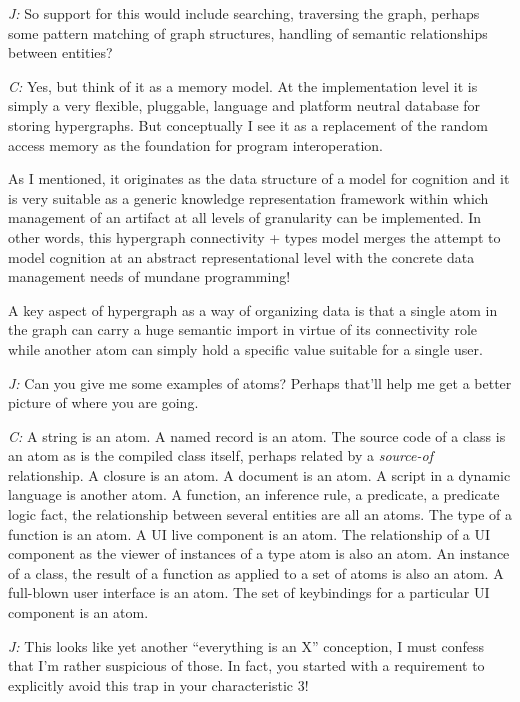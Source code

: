 \documentclass[10pt]{sigplanconf}
\begin{document}
\emph{J:} So support for this would include searching, traversing the graph, perhaps some pattern matching of graph structures, handling of semantic relationships between entities?

\emph{C:} Yes, but think of it as a memory model. At the implementation level it is simply a very flexible, pluggable, language and platform neutral database for storing hypergraphs. But conceptually I see it as a replacement of the random access memory as the foundation for program interoperation.

As I mentioned, it originates as the data structure of a model for cognition and it is very suitable as a generic knowledge representation framework within which management of an artifact at all levels of granularity can be implemented. In other words, this hypergraph connectivity + types model merges the attempt to model cognition at an abstract representational level with the concrete data management needs of mundane programming!

A key aspect of hypergraph as a way of organizing data is that a single atom in the graph can carry a huge semantic import in virtue of its connectivity role while another atom can simply hold a specific value suitable for a single user.

\emph{J:} Can you give me some examples of atoms? Perhaps that'll help me get a better picture of where you are going.

\emph{C:} A string is an atom. A named record is an atom. The source code of a class is an atom as is the compiled class itself, perhaps related by a \emph{source-of} relationship. A closure is an atom. A document is an atom. A script in a dynamic language is another atom. A function, an inference rule, a predicate, a predicate logic fact, the relationship between several entities are all an atoms. The type of a function is an atom. A UI live component is an atom. The relationship of a UI component as the viewer of instances of a type atom is also an atom. An instance of a class, the result of a function as applied to a set of atoms is also an atom. A full-blown user interface is an atom. The set of keybindings for a particular UI component is an atom.

\emph{J:} This looks like yet another ``everything is an X'' conception, I must confess that I'm rather suspicious of those. In fact, you started with a requirement to explicitly avoid this trap in your characteristic 3!
\end{document}
